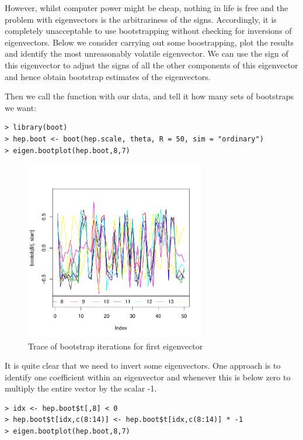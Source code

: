 However, whilst computer power might be cheap, nothing in life is free and the problem with eigenvectors is the arbitrariness of the signs.   Accordingly, it is completely unacceptable to use bootstrapping without checking for inversions of eigenvectors.   Below we consider carrying out some boostrapping, plot the results and identify the most unreasonably volatile eigenvector.   We can use the sign of this eigenvector to adjust the signs of all the other components of this eigenvector and hence obtain bootstrap estimates of the eigenvectors.

Then we call the function with our data, and tell it how many sets of bootstraps we want:

\singlespacing
\begin{verbatim}
> library(boot)
> hep.boot <- boot(hep.scale, theta, R = 50, sim = "ordinary")
> eigen.bootplot(hep.boot,8,7)
\end{verbatim}
\onehalfspacing

\begin{figure}
\begin{center}
\includegraphics[width = 0.7\textwidth]{images/boottraceplot}
\caption{Trace of bootstrap iterations for first eigenvector}
\label{boottrace}
\end{center}
\end{figure}

It is quite clear that we need to invert some eigenvectors.   One approach is to identify one coefficient within an eigenvector and whenever this is below zero to multiply the entire vector by the scalar -1.   

\singlespacing
\begin{verbatim}
> idx <- hep.boot$t[,8] < 0
> hep.boot$t[idx,c(8:14)] <- hep.boot$t[idx,c(8:14)] * -1
> eigen.bootplot(hep.boot,8,7)
\end{verbatim}
\onehalfspacing

